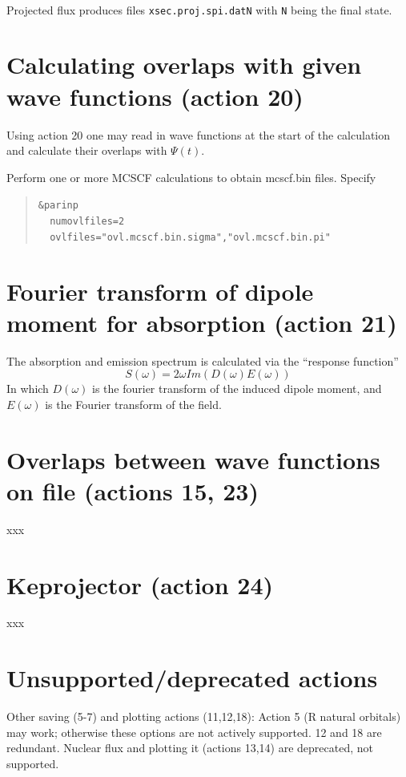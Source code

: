 \documentclass[10pt,leqno, oneside]{book}
\begin{document}
\

Projected flux produces files \verb#xsec.proj.spi.datN# with \verb#N# being the final state.

\section{Calculating overlaps with given wave functions (action 20)}

Using action 20 one may read in wave functions at the start of the calculation and calculate their overlaps with $\Psi(t)$.

Perform one or more MCSCF calculations to obtain mcscf.bin files.  Specify
\begin{quote}
{\footnotesize
\verb#&parinp# \\
\verb#  numovlfiles=2# \\
\verb#  ovlfiles="ovl.mcscf.bin.sigma","ovl.mcscf.bin.pi"# \\
}\end{quote}


\section{Fourier transform of dipole moment for absorption (action 21)}

The absorption and emission spectrum is calculated via the ``response function''
\begin{equation}
S(\omega) = 2 \omega Im (D(\omega) E(\omega))
\end{equation}
In which $D(\omega)$ is the fourier transform of the induced dipole moment, and $E(\omega)$ is the Fourier transform of the field.


\section{Overlaps between wave functions on file (actions 15, 23)}

xxx

\section{Keprojector (action 24)}

xxx

\section{Unsupported/deprecated actions}

Other saving (5-7) and plotting actions (11,12,18):
Action 5 (R natural orbitals) may work; otherwise these options are not actively supported.  12 and 18 are redundant.
Nuclear flux and plotting it (actions 13,14) are deprecated, not supported.
\end{document}

